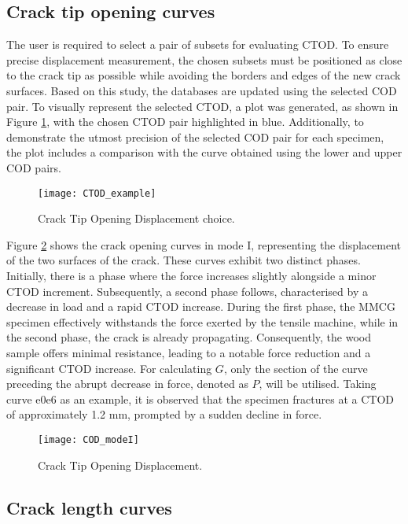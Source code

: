 \subsection{Crack tip opening curves}

The user is required to select a pair of subsets for evaluating CTOD. To ensure precise displacement measurement, the chosen subsets must be positioned as close to the crack tip as possible while avoiding the borders and edges of the new crack surfaces. Based on this study, the databases are updated using the selected COD pair. To visually represent the selected CTOD, a plot was generated, as shown in Figure \ref{fig:CTOD_example}, with the chosen CTOD pair highlighted in blue. Additionally, to demonstrate the utmost precision of the selected COD pair for each specimen, the plot includes a comparison with the curve obtained using the lower and upper COD pairs.

\begin{figure}[htp]
	\centering
	\texttt{[image: CTOD\_example]}
	\caption{Crack Tip Opening Displacement choice.}
	\label{fig:CTOD_example}
\end{figure}

Figure \ref{fig:COD_modeI} shows the crack opening curves in mode I, representing the displacement of the two surfaces of the crack. These curves exhibit two distinct phases. Initially, there is a phase where the force increases slightly alongside a minor CTOD increment. Subsequently, a second phase follows, characterised by a decrease in load and a rapid CTOD increase. During the first phase, the MMCG specimen effectively withstands the force exerted by the tensile machine, while in the second phase, the crack is already propagating. Consequently, the wood sample offers minimal resistance, leading to a notable force reduction and a significant CTOD increase.
For calculating $G$, only the section of the curve preceding the abrupt decrease in force, denoted as $P$, will be utilised. Taking curve e0e6 as an example, it is observed that the specimen fractures at a CTOD of approximately 1.2 mm, prompted by a sudden decline in force.

\begin{figure}[htp]
	\centering
	\texttt{[image: COD\_modeI]}
	\caption{Crack Tip Opening Displacement.}
	\label{fig:COD_modeI}
\end{figure}

\subsection{Crack length curves}

